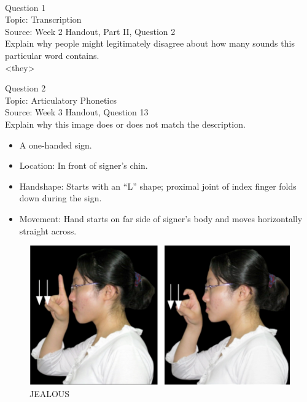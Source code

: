 \documentclass[12pt]{article}
\begin{document}
\newpage

\begin{center}
\textbf{{\color{red}{\HUGE END OF EXAM}}}\\

\end{center}
\newpage

\begin{center}
\textbf{{\color{blue}{\HUGE START OF EXAM\\}}}

\textbf{{\color{blue}{\HUGE Student ID: 43736\\}}}

\textbf{{\color{blue}{\HUGE \\}}}

\end{center}
\newpage

{\large Question 1}\\

Topic: Transcription\\
Source: Week 2 Handout, Part II, Question 2\\

Explain why people might legitimately disagree about how many sounds this particular word contains.\\

<they>


\newpage

{\large Question 2}\\

Topic: Articulatory Phonetics\\
Source: Week 3 Handout, Question 13\\

Explain why this image does or does not match the description.\\

\begin{itemize} \item A one-handed sign. \item Location: In front of signer’s chin. \item Handshape: Starts with an “L” shape; proximal joint of index finger folds down during the sign. \item Movement: Hand starts on far side of signer’s body and moves horizontally straight across. \end{itemize}

\begin{figure}[H]
\includegraphics{../images/taiwansign_jealous.png}
\caption{JEALOUS}
\end{figure}
\end{document}

